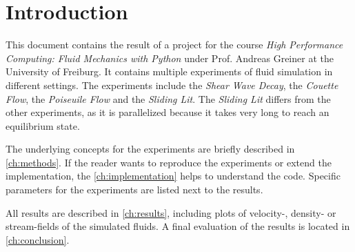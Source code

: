 \chapter{Introduction}

This document contains the result of a project for the course \textit{High Performance Computing: Fluid Mechanics with Python} under Prof. Andreas Greiner at the University of Freiburg.
It contains multiple experiments of fluid simulation in different settings.
The experiments include the \textit{Shear Wave Decay}, the \textit{Couette Flow}, the \textit{Poiseuile Flow} and the \textit{Sliding Lit}.
The \textit{Sliding Lit} differs from the other experiments, as it is parallelized because it takes very long to reach an equilibrium state.
\newline

The underlying concepts for the experiments are briefly described in \cref{ch:methods}.
If the reader wants to reproduce the experiments or extend the implementation, the \cref{ch:implementation} helps to understand the code.
Specific parameters for the experiments are listed next to the results.
\newline

All results are described in \cref{ch:results}, including plots of velocity-, density- or stream-fields of the simulated fluids.
A final evaluation of the results is located in \cref{ch:conclusion}.